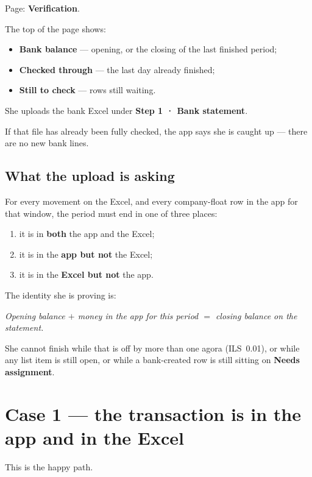 \documentclass[11pt,a4paper]{article}
\begin{document}
Page: \textbf{Verification}.

The top of the page shows:
\begin{itemize}
  \item \textbf{Bank balance} --- opening, or the closing of the last
        finished period;
  \item \textbf{Checked through} --- the last day already finished;
  \item \textbf{Still to check} --- rows still waiting.
\end{itemize}

She uploads the bank Excel under \textbf{Step 1 · Bank statement}.

If that file has already been fully checked, the app says she is
caught up --- there are no new bank lines.

\subsection{What the upload is asking}

For every movement on the Excel, and every company-float row in the app
for that window, the period must end in one of three places:

\begin{enumerate}
  \item it is in \textbf{both} the app and the Excel;
  \item it is in the \textbf{app but not} the Excel;
  \item it is in the \textbf{Excel but not} the app.
\end{enumerate}

The identity she is proving is:

\begin{center}
\textit{Opening balance $+$ money in the app for this period
$=$ closing balance on the statement.}
\end{center}

She cannot finish while that is off by more than one agora (ILS~0.01),
or while any list item is still open, or while a bank-created row is
still sitting on \textbf{Needs assignment}.

\section{Case 1 --- the transaction is in the app and in the Excel}

This is the happy path.
\end{document}
